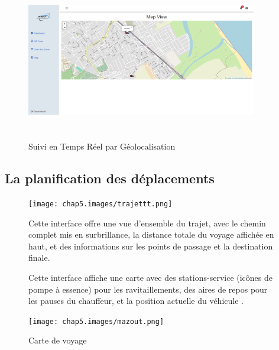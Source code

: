 \begin{figure}[h!]
    \centering
    \includegraphics[width=0.9\textwidth,height=7cm]{chap5.images/map weeeb.png}
    \caption{Suivi en Temps Réel par Géolocalisation}
\end{figure}

\subsection{La planification des déplacements }

\begin{figure}[htbp]
    \centering
    \begin{minipage}{0.39\textwidth}
        \centering
        \texttt{[image: chap5.images/trajettt.png]}
        \caption{}

    \end{minipage}
    \hfill
    \begin{minipage}{0.58\textwidth}
        \raggedright
        Cette interface offre une vue d'ensemble du trajet, avec le chemin complet mis en surbrillance, la distance totale du voyage affichée en haut, et des informations sur les points de passage et la destination finale.
    \end{minipage}
\end{figure}


\newpage

\begin{figure}[htbp]
    \centering
    \begin{minipage}{0.58\textwidth}
        \raggedright
        Cette interface affiche une carte avec des stations-service (icônes de pompe à essence) pour les ravitaillements, des aires de repos pour les pauses du chauffeur, et la position actuelle du véhicule .
    \end{minipage}
    \hfill
    \begin{minipage}{0.39\textwidth}
        \centering
        \texttt{[image: chap5.images/mazout.png]}
        \caption{Carte de voyage}

    \end{minipage}
\end{figure}



